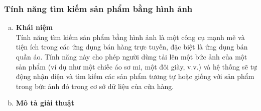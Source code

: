 \subsubsection{Tính năng tìm kiếm sản phẩm bằng hình ảnh}

\begin{enumerate}[a.]
\item \textbf{Khái niệm}\\
Tính năng tìm kiếm sản phẩm bằng hình ảnh là một công cụ mạnh mẽ và tiện ích trong các ứng dụng bán hàng trực tuyến, đặc biệt là ứng dụng bán quần áo. Tính năng này cho phép người dùng tải lên một bức ảnh của một sản phẩm (ví dụ như một chiếc áo sơ mi, một đôi giày, v.v.) và hệ thống sẽ tự động nhận diện và tìm kiếm các sản phẩm tương tự hoặc giống với sản phẩm trong bức ảnh đó trong cơ sở dữ liệu của cửa hàng.\\
\item \textbf{Mô tả giải thuật}



\end{enumerate}
